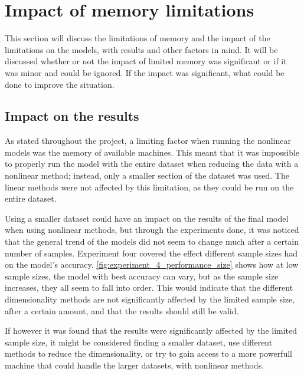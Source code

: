 \section{Impact of memory limitations}\label{sec:impact_of_memory_limitations}
This section will discuss the limitations of memory and the impact of the limitations on the models, with results and other factors in mind. It will be discussed whether or not the impact of limited memory was significant or if it was minor and could be ignored. If the impact was significant, what could be done to improve the situation. 


\subsection{Impact on the results}\label{subsec:impact_on_results}
As stated throughout the project, a limiting factor when running the nonlinear models was the memory of available machines. This meant that it was impossible to properly run the model with the entire dataset when reducing the data with a nonlinear method; instead, only a smaller section of the dataset was used. The linear methods were not affected by this limitation, as they could be run on the entire dataset.

Using a smaller dataset could have an impact on the results of the final model when using nonlinear methods, but through the experiments done, it was noticed that the general trend of the models did not seem to change much after a certain number of samples. Experiment four covered the effect different sample sizes had on the model's accuracy. \autoref{fig:experiment_4_performance_size} shows how at low sample sizes, the model with best accuracy can vary, but as the sample size increases, they all seem to fall into order. This would indicate that the different dimensionality methods are not significantly affected by the limited sample size, after a certain amount, and that the results should still be valid.

If however it was found that the results were significantly affected by the limited sample size, it might be considered finding a smaller dataset, use different methods to reduce the dimensionality, or try to gain access to a more powerfull machine that could handle the larger datasets, with nonlinear methods.


